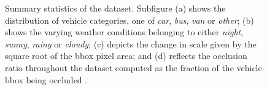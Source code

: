 \begin{figure}[t]
\begin{subfigure}[b]{\uadetracfigsize\textwidth}
        \caption[]{}
    \end{subfigure}
    \caption[ dataset overview]{Summary statistics of the  dataset. Subfigure (a) shows the distribution of vehicle categories, one of \emph{car}, \emph{bus}, \emph{van} or \emph{other}; (b) shows the varying weather conditions belonging to either \emph{night}, \emph{sunny}, \emph{rainy} or \emph{cloudy}; (c) depicts the change in scale given by the square root of the \gls{bbox} pixel area; and (d) reflects the occlusion ratio throughout the dataset computed as the fraction of the vehicle \gls{bbox} being occluded . }
    \label{fig:UADETRACStats}
\end{figure}

